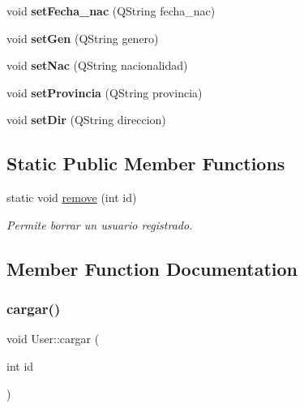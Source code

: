 \begin{DoxyCompactItemize}
void {\bfseries set\+Fecha\+\_\+nac} (Q\+String fecha\+\_\+nac)
\item 
\mbox{\label{classUser_a23659aed8f058b19a148449c77a5509e}} 
void {\bfseries set\+Gen} (Q\+String genero)
\item 
\mbox{\label{classUser_ab3992a71bc607e8c919a7d9f941c9b4f}} 
void {\bfseries set\+Nac} (Q\+String nacionalidad)
\item 
\mbox{\label{classUser_ad5fa7528ea5397868f5cf2ca99fef6cb}} 
void {\bfseries set\+Provincia} (Q\+String provincia)
\item 
\mbox{\label{classUser_a4b9aee0b43928b561f11d95299af370b}} 
void {\bfseries set\+Dir} (Q\+String direccion)
\end{DoxyCompactItemize}
\subsection*{Static Public Member Functions}
\begin{DoxyCompactItemize}
\item 
static void \mbox{\hyperlink{classUser_a7c4b278350236406ce9dcd6b8f707f47}{remove}} (int id)
\begin{DoxyCompactList}\small\item\em Permite borrar un usuario registrado. \end{DoxyCompactList}\end{DoxyCompactItemize}


\subsection{Member Function Documentation}
\mbox{\label{classUser_a3d1f98d7ddb605391b6d2220747c2bd5}} 
\subsubsection{\texorpdfstring{cargar()}{cargar()}}
{\footnotesize\ttfamily void User\+::cargar (\begin{DoxyParamCaption}\item[{int}]{id }\end{DoxyParamCaption})}



